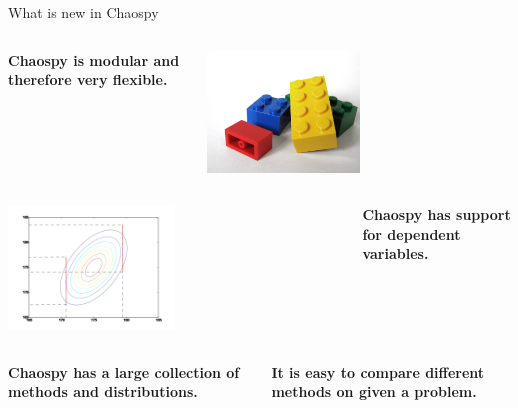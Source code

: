 \documentclass[handout]{beamer}
\begin{document}
\begin{frame}{What is new in Chaospy}

\vspace{-7mm}
\begin{columns}

     \begin{center}
      \textbf<1>{Chaospy is modular and therefore very flexible.}
     \end{center}
     \begin{center}
            \includegraphics[width=0.5\textwidth]{lego.jpg}
     \end{center}

 \end{columns}

\pause
\vspace{7mm}
\begin{columns}
     \begin{center}
            \includegraphics[width=0.5\textwidth]{dependent.png}
     \end{center}
     \begin{center}
      \textbf<2>{Chaospy has support for dependent variables.}
     \end{center}
 \end{columns}

\pause
\vspace{7mm}
 \begin{columns}
      \begin{center}
             \textbf<3>{Chaospy has a large collection of methods and distributions.}
      \end{center}
      \begin{center}
      \pause \textbf<4>{It is easy to compare different methods on given a problem.}
      \end{center}
  \end{columns}

\end{frame}
\end{document}
